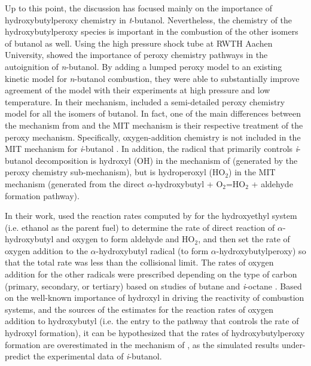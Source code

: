 \documentclass[12pt, letterpaper]{article}
\begin{document}
Up to this point, the discussion has focused mainly on the importance of
hydroxybutylperoxy chemistry in \textit{t}-butanol. Nevertheless, the chemistry
of the hydroxybutylperoxy species is important in the combustion of the other
isomers of butanol as well. Using the high pressure shock tube at RWTH Aachen
University, \textcite{Vranckx2011} showed the importance of peroxy chemistry
pathways in the autoignition of \textit{n}-butanol. By adding a lumped peroxy
model to an existing kinetic model for \textit{n}-butanol combustion, they were
able to substantially improve agreement of the model with their experiments at
high pressure and low temperature. In their mechanism, \textcite{Sarathy2012}
included a semi-detailed peroxy chemistry model for all the isomers of butanol.
In fact, one of the main differences between the mechanism from
\textcite{Sarathy2012} and the MIT mechanism \cite{Hansen2013,Merchant2013} is
their respective treatment of the peroxy mechanism. Specifically,
oxygen-addition chemistry is not included in the MIT mechanism for
\textit{i}-butanol \cite{Hansen2013,Merchant2013}. In addition, the radical
that primarily controls \textit{i}-butanol decomposition is hydroxyl (OH) in
the mechanism of \textcite{Sarathy2012} (generated by the peroxy chemistry
sub-mechanism), but is hydroperoxyl (HO$_2$) in the MIT mechanism
\cite{Hansen2013,Merchant2013} (generated from the direct $\alpha$-hydroxybutyl
+ O$_2$=HO$_2$ + aldehyde formation pathway).

In their work, \textcite{Sarathy2012} used the reaction rates computed by
\textcite{DaSilva2009} for the hydroxyethyl system (i.e. ethanol as the parent
fuel) to determine the rate of direct reaction of $\alpha$-hydroxybutyl and
oxygen to form aldehyde and HO$_2$, and then set the rate of oxygen addition to
the $\alpha$-hydroxybutyl radical (to form $\alpha$-hydroxybutylperoxy) so that
the total rate was less than the collisional limit. The rates of oxygen
addition for the other radicals were prescribed depending on the type of carbon
(primary, secondary, or tertiary) based on studies of butane and
\textit{i}-octane \cite{Sarathy2012}. Based on the well-known importance of
hydroxyl in driving the reactivity of combustion systems, and the sources of
the estimates for the reaction rates of oxygen addition to hydroxybutyl (i.e.
the entry to the pathway that controls the rate of hydroxyl formation), it can
be hypothesized that the rates of hydroxybutylperoxy formation are
overestimated in the mechanism of \textcite{Sarathy2012}, as the simulated
results under-predict the experimental data of \textit{i}-butanol.
\end{document}
